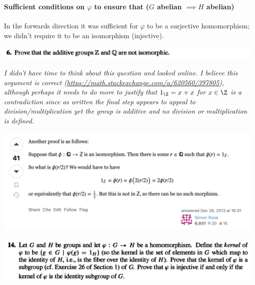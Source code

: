 {\bf Sufficient conditions on $\varphi$ to ensure that ($G$ abelian $\implies H$ abelian)\\}\\
In the forwards direction it was sufficient for $\varphi$ to be a surjective homomorphism; we didn't
require it to be an isomorphism (injective).

\newpage
\begin{mdframed}
\includegraphics[width=400pt]{img/abstract-algebra--nf--3-89f3.png}
\end{mdframed}

{\it I didn't have time to think about this question and looked online. I believe this argument is
correct (\url{https://math.stackexchange.com/a/620560/397805}), although perhaps it needs to do more to justify
that $1_\Z = x + x$ for $x \in \Z$ is a contradiction since as written the final step appears to
appeal to division/multiplication yet the group is additive and no division or multiplication is
defined.}
\begin{mdframed}
\includegraphics[width=400pt]{img/abstract-algebra--nf--3-8b25.png}
\end{mdframed}


\begin{mdframed}
\newpage
\includegraphics[width=400pt]{img/abstract-algebra--nf--3-b601.png}
\end{mdframed}



